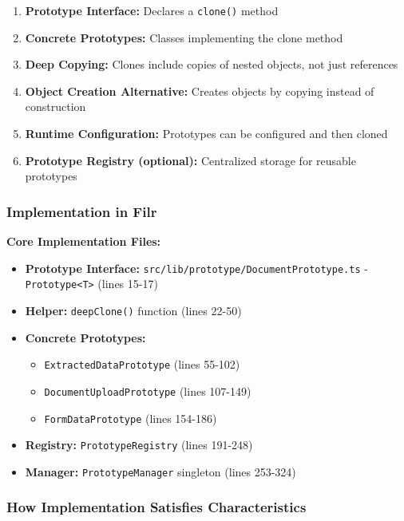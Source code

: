 \documentclass[11pt]{article}
\begin{document}
\begin{enumerate}[noitemsep]
    \item \textbf{Prototype Interface:} Declares a \texttt{clone()} method
    \item \textbf{Concrete Prototypes:} Classes implementing the clone method
    \item \textbf{Deep Copying:} Clones include copies of nested objects, not just references
    \item \textbf{Object Creation Alternative:} Creates objects by copying instead of construction
    \item \textbf{Runtime Configuration:} Prototypes can be configured and then cloned
    \item \textbf{Prototype Registry (optional):} Centralized storage for reusable prototypes
\end{enumerate}

\subsubsection{Implementation in Filr}

\textbf{Core Implementation Files:}
\begin{itemize}[noitemsep]
    \item \textbf{Prototype Interface:} \texttt{src/lib/prototype/DocumentPrototype.ts} - \texttt{Prototype<T>} (lines 15-17)
    \item \textbf{Helper:} \texttt{deepClone()} function (lines 22-50)
    \item \textbf{Concrete Prototypes:}
    \begin{itemize}[noitemsep]
        \item \texttt{ExtractedDataPrototype} (lines 55-102)
        \item \texttt{DocumentUploadPrototype} (lines 107-149)
        \item \texttt{FormDataPrototype} (lines 154-186)
    \end{itemize}
    \item \textbf{Registry:} \texttt{PrototypeRegistry} (lines 191-248)
    \item \textbf{Manager:} \texttt{PrototypeManager} singleton (lines 253-324)
\end{itemize}

\subsubsection{How Implementation Satisfies Characteristics}
\end{document}
